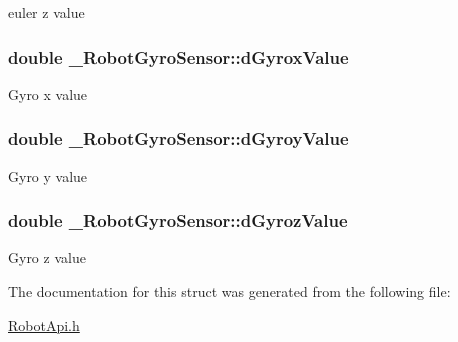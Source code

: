 euler z value \hypertarget{struct__RobotGyroSensor_a91d4a3ae87bab30dfcd0338249e435f4}{
\subsubsection[{d\-Gyrox\-Value}]{\setlength{\rightskip}{0pt plus 5cm}double \-\_\-\-Robot\-Gyro\-Sensor\-::d\-Gyrox\-Value}}\label{struct__RobotGyroSensor_a91d4a3ae87bab30dfcd0338249e435f4}
Gyro x value \hypertarget{struct__RobotGyroSensor_a680c6b5d38816f4ec00b17da210d232a}{
\subsubsection[{d\-Gyroy\-Value}]{\setlength{\rightskip}{0pt plus 5cm}double \-\_\-\-Robot\-Gyro\-Sensor\-::d\-Gyroy\-Value}}\label{struct__RobotGyroSensor_a680c6b5d38816f4ec00b17da210d232a}
Gyro y value \hypertarget{struct__RobotGyroSensor_a7294f5008f4215b13022d0f2e467d699}{
\subsubsection[{d\-Gyroz\-Value}]{\setlength{\rightskip}{0pt plus 5cm}double \-\_\-\-Robot\-Gyro\-Sensor\-::d\-Gyroz\-Value}}\label{struct__RobotGyroSensor_a7294f5008f4215b13022d0f2e467d699}
Gyro z value 

The documentation for this struct was generated from the following file\-:\begin{DoxyCompactItemize}
\item 
\hyperlink{RobotApi_8h}{Robot\-Api.\-h}\end{DoxyCompactItemize}
